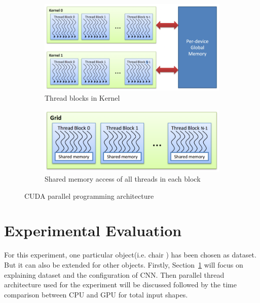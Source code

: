 \documentclass[11pt]{article}       %
\begin{document}
\begin{figure}
\centering
\begin{subfigure}{.5\textwidth}
  \centering
  \includegraphics[width=1.0\linewidth]{globalmemory.png}
  \caption{Thread blocks in Kernel}
  \label{fig:sub1}
\end{subfigure}%
\begin{subfigure}{.4\textwidth}
  \centering
  \includegraphics[width=1.0\linewidth]{threadgrid.png}\newline
  \caption{Shared memory access of all threads in each block}
  \label{fig:sub2}
\end{subfigure}
\caption{CUDA parallel programming architecture}
\label{fig:test}
\end{figure}


\section{Experimental Evaluation} \label{expEval}

For this experiment, one particular object(i.e. chair ) has been chosen as dataset. But it can also be extended for other objects. Firstly, Section~\ref{expEval} will focus on explaining dataset and the configuration of CNN. Then parallel thread architecture used for the experiment will be discussed followed by the time comparison between CPU and GPU for total input shapes.
\end{document}

